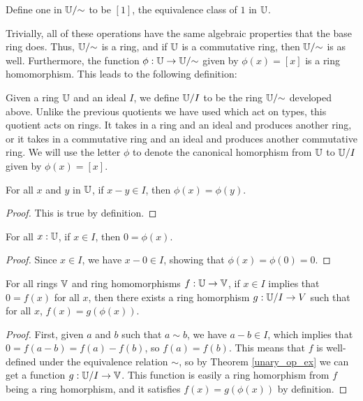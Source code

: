 \documentclass[../../math.tex]{subfiles}
\begin{document}
\begin{instance}
    Define one in $\mathbb{U}/{\sim}$ to be $[1]$, the equivalence class of $1$ in
    $\mathbb{U}$.
\end{instance}

Trivially, all of these operations have the same algebraic properties that the
base ring does.  Thus, $\mathbb{U}/{\sim}$ is a ring, and if $\mathbb{U}$ is a commutative ring,
then $\mathbb{U}/{\sim}$ is as well.  Furthermore, the function $\phi : \mathbb{U} \to
\mathbb{U}/{\sim}$ given by $\phi(x) = [x]$ is a ring homomorphism.  This leads to the
following definition:

\begin{definition}
    Given a ring $\mathbb{U}$ and an ideal $I$, we define $\mathbb{U}/I$ to be the ring
    $\mathbb{U}/{\sim}$ developed above.  Unlike the previous quotients we have used
    which act on types, this quotient acts on rings.  It takes in a ring and an
    ideal and produces another ring, or it takes in a commutative ring and an
    ideal and produces another commutative ring.  We will use the letter $\phi$
    to denote the canonical homorphism from $\mathbb{U}$ to $\mathbb{U}/I$ given by $\phi(x) =
    [x]$.
\end{definition}

\begin{theorem} \label{to_qring_eq}
    For all $x$ and $y$ in $\mathbb{U}$, if $x - y \in I$, then $\phi(x) = \phi(y)$.
\end{theorem}
\begin{proof}
    This is true by definition.
\end{proof}

\begin{theorem} \label{to_qring_zero}
    For all $x : \mathbb{U}$, if $x \in I$, then $0 = \phi(x)$.
\end{theorem}
\begin{proof}
    Since $x \in I$, we have $x - 0 \in I$, showing that $\phi(x) = \phi(0) =
    0$.
\end{proof}

\begin{theorem} \label{qring_f_ex}
    For all rings $\mathbb{V}$ and ring homomorphisms $f : \mathbb{U} \to \mathbb{V}$, if $x \in I$
    implies that $0 = f(x)$ for all $x$, then there exists a ring homorphism $g
    : \mathbb{U}/I \to V$ such that for all $x$, $f(x) = g(\phi(x))$.
\end{theorem}
\begin{proof}
    First, given $a$ and $b$ such that $a \sim b$, we have $a - b \in I$, which
    implies that $0 = f(a - b) = f(a) - f(b)$, so $f(a) = f(b)$.  This means
    that $f$ is well-defined under the equivalence relation $\sim$, so by
    Theorem \ref{unary_op_ex} we can get a function $g : \mathbb{U}/I \to \mathbb{V}$.  This
    function is easily a ring homorphism from $f$ being a ring homorphism, and
    it satisfies $f(x) = g(\phi(x))$ by definition.
\end{proof}
\end{document}

